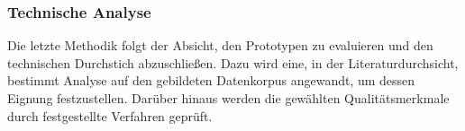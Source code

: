 \subsubsection{Technische Analyse }
Die letzte Methodik folgt der Absicht, den Prototypen zu evaluieren und den technischen Durchstich abzuschließen. Dazu wird eine, in der Literaturdurchsicht, bestimmt Analyse auf den gebildeten Datenkorpus angewandt, um dessen Eignung festzustellen. 
Darüber hinaus werden die gewählten Qualitätsmerkmale durch festgestellte Verfahren geprüft. 